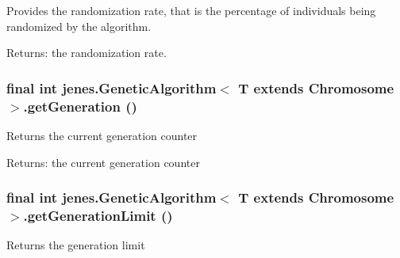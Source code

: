 Provides the randomization rate, that is the percentage of individuals being randomized by the algorithm. 

\begin{Desc}
\item[Returns:]the randomization rate. \end{Desc}
\hypertarget{classjenes_1_1_genetic_algorithm_3_01_t_01extends_01_chromosome_01_4_25602ec654959a43a64f12e92251cb47}{
\subsubsection[getGeneration]{\setlength{\rightskip}{0pt plus 5cm}final int jenes.GeneticAlgorithm$<$ T extends Chromosome $>$.getGeneration ()}}
\label{classjenes_1_1_genetic_algorithm_3_01_t_01extends_01_chromosome_01_4_25602ec654959a43a64f12e92251cb47}


Returns the current generation counter

\begin{Desc}
\item[Returns:]the current generation counter \end{Desc}
\hypertarget{classjenes_1_1_genetic_algorithm_3_01_t_01extends_01_chromosome_01_4_c6eceff2ad4a055f3c6047fb4c272ef3}{
\subsubsection[getGenerationLimit]{\setlength{\rightskip}{0pt plus 5cm}final int jenes.GeneticAlgorithm$<$ T extends Chromosome $>$.getGenerationLimit ()}}
\label{classjenes_1_1_genetic_algorithm_3_01_t_01extends_01_chromosome_01_4_c6eceff2ad4a055f3c6047fb4c272ef3}


Returns the generation limit 

